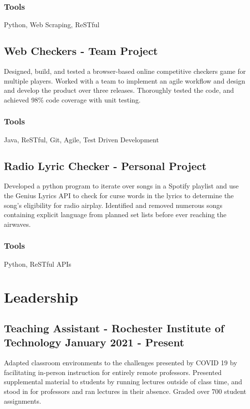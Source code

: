 \documentclass[11pt, letterpaper]{article}
\begin{document}
            \subsubsection{Tools}
                Python, Web Scraping, ReSTful

        \subsection{Web Checkers - Team Project}
            Designed, build, and tested a browser-based online competitive checkers game for multiple players. 
            Worked with a team to implement an agile workflow and design and develop the product over three 
            releases. Thoroughly tested the code, and achieved 98\% code coverage with unit testing.
            \subsubsection{Tools}
                Java, ReSTful, Git, Agile, Test Driven Development

        \subsection{Radio Lyric Checker - Personal Project}
            Developed a python program to iterate over songs in a Spotify playlist and use the Genius Lyrics
            API to check for curse words in the lyrics to determine the song's eligibility for radio airplay. 
            Identified and removed numerous songs containing explicit language from planned set lists before
            ever reaching the airwaves.
            \subsubsection{Tools}
                Python, ReSTful APIs

    \section{Leadership}
        \subsection{Teaching Assistant - Rochester Institute of Technology \hfill January 2021 - Present}
            Adapted classroom environments to the challenges presented by COVID 19 by facilitating in-person
            instruction for entirely remote professors. Presented supplemental material to students by running 
            lectures outside of class time, and stood in for professors and ran lectures in their absence. 
            Graded over 700 student assignments.
\end{document}
